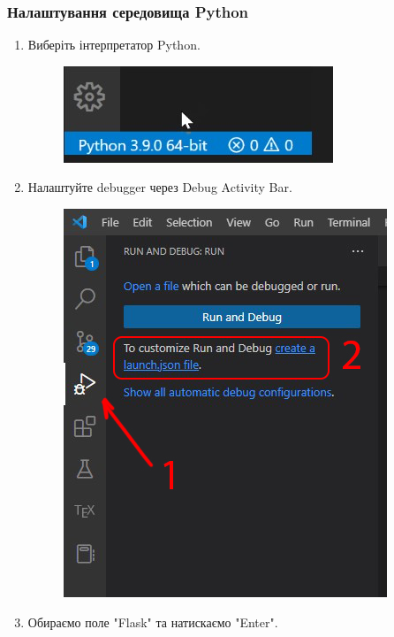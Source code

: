 \documentclass[a4paper,12pt]{article}
\begin{document}
    \subsubsection{Налаштування середовища Python}
    \begin{enumerate}
        \item Виберіть інтерпретатор Python.
        \begin{figure}[h!]
            \begin{center}
                \includegraphics[scale=0.7]{Prt sc/Figure_10.jpg}
            \end{center}
        \end{figure}
\newpage
        \item Налаштуйте debugger через Debug Activity Bar.
        \begin{figure}[h!]
            \begin{center}
                \includegraphics[scale=0.7]{Prt sc/Figure_11.jpg}
            \end{center}
        \end{figure}
        \item Обираємо поле "Flask" та натискаємо "Enter".

\end{enumerate}
\end{document}

